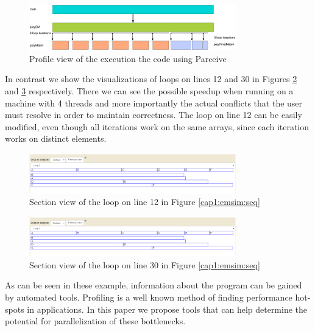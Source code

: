 \begin{figure}[!ht]
	\centering
	\includegraphics[width=0.8\textwidth]{emsimprofile}
	\caption{Profile view of the execution the code using Parceive}
	\label{cap1:emsim:profile}
\end{figure}

In contrast we show the visualizations of loops on lines 12 and 30 in Figures \ref{cap1:emsim:sections1} and \ref{cap1:emsim:sections2} respectively. There we can see the possible speedup when running on a machine with 4 threads and more importantly the actual conflicts that the user must resolve in order to maintain correctness. The loop on line 12 can be easily modified, even though all iterations work on the same arrays, since each iteration works on distinct elements.

\begin{figure}[!ht]
	\centering
	\includegraphics[width=0.8\textwidth]{loop1section}
	\caption{Section view of the loop on line 12 in Figure \ref{cap1:emsim:seq}}
	\label{cap1:emsim:sections1}
\end{figure}

\begin{figure}[!ht]
	\centering
	\includegraphics[width=0.8\textwidth]{loop2section}
	\caption{Section view of the loop on line 30 in Figure \ref{cap1:emsim:seq}}
	\label{cap1:emsim:sections2}
\end{figure}

As can be seen in these example, information about the program can be gained by automated tools. Profiling is a well known method of finding performance hot-spots in applications. In this paper we propose tools that can help determine the potential for parallelization of these bottlenecks.

